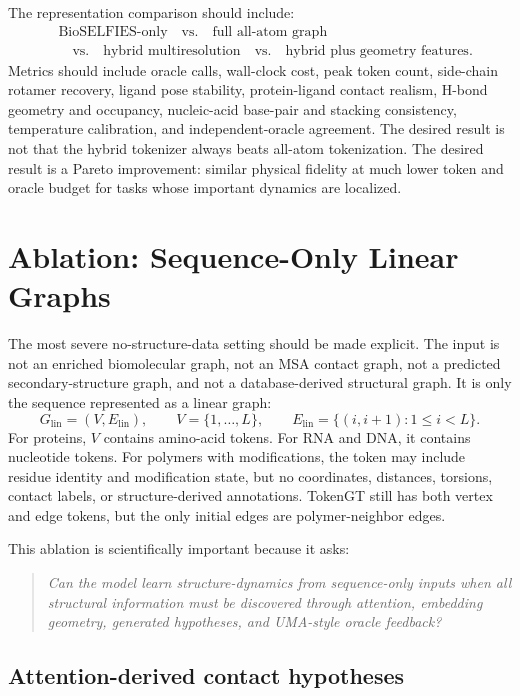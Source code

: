 \documentclass[11pt]{article}
\newcommand{\bioselfies}{\mathrm{BioSELFIES}}
\begin{document}
The representation comparison should include:
\[
\begin{aligned}
&\bioselfies\text{-only}
\quad\text{vs.}\quad
\text{full all-atom graph}\\
&\quad\text{vs.}\quad
\text{hybrid multiresolution}
\quad\text{vs.}\quad
\text{hybrid plus geometry features}.
\end{aligned}
\]
Metrics should include oracle calls, wall-clock cost, peak token count, side-chain rotamer recovery, ligand pose stability, protein-ligand contact realism, H-bond geometry and occupancy, nucleic-acid base-pair and stacking consistency, temperature calibration, and independent-oracle agreement. The desired result is not that the hybrid tokenizer always beats all-atom tokenization. The desired result is a Pareto improvement: similar physical fidelity at much lower token and oracle budget for tasks whose important dynamics are localized.

\section{Ablation: Sequence-Only Linear Graphs}

The most severe no-structure-data setting should be made explicit. The input is not an enriched biomolecular graph, not an MSA contact graph, not a predicted secondary-structure graph, and not a database-derived structural graph. It is only the sequence represented as a linear graph:
\[
G_{\mathrm{lin}}=(V,E_{\mathrm{lin}}),\qquad
V=\{1,\dots,L\},\qquad
E_{\mathrm{lin}}=\{(i,i+1):1\le i<L\}.
\]
For proteins, $V$ contains amino-acid tokens. For RNA and DNA, it contains nucleotide tokens. For polymers with modifications, the token may include residue identity and modification state, but no coordinates, distances, torsions, contact labels, or structure-derived annotations. TokenGT still has both vertex and edge tokens, but the only initial edges are polymer-neighbor edges.

This ablation is scientifically important because it asks:
\begin{quote}
\emph{Can the model learn structure-dynamics from sequence-only inputs when all structural information must be discovered through attention, embedding geometry, generated hypotheses, and UMA-style oracle feedback?}
\end{quote}

\subsection{Attention-derived contact hypotheses}
\end{document}
